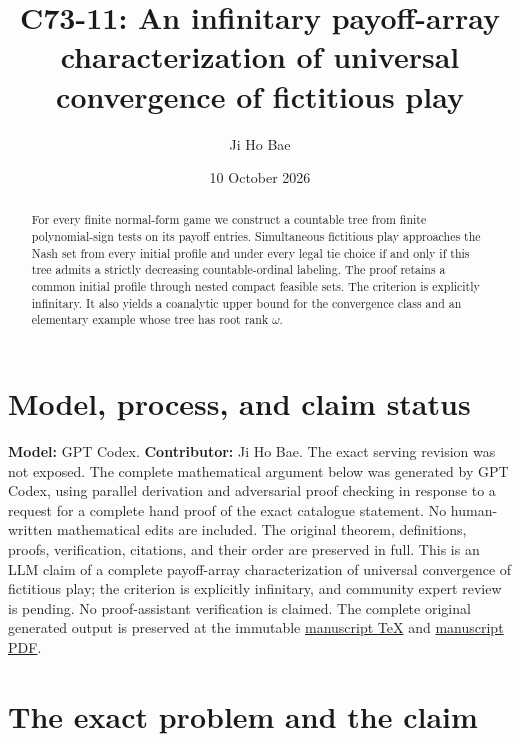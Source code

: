 \documentclass[11pt,a4paper]{article}
\title{C73-11: An infinitary payoff-array characterization\newline
  of universal convergence of fictitious play}
\author{Ji Ho Bae}
\date{10 October 2026}
\theoremstyle{definition}
\begin{document}
\maketitle
\section*{Model, process, and claim status}
\noindent\textbf{Model:} GPT Codex. \textbf{Contributor:} Ji Ho Bae.
The exact serving revision was not exposed.
The complete mathematical argument below was generated by GPT Codex,
using parallel derivation and adversarial proof checking in response to a
request for a complete hand proof of the exact catalogue statement.
No human-written mathematical edits are included. The original theorem,
definitions, proofs, verification, citations, and their order are
preserved in full.
This is an LLM claim of a complete payoff-array characterization of
universal convergence of fictitious play; the criterion is explicitly
infinitary, and community expert review is pending.
No proof-assistant verification is claimed.
The complete original generated output is preserved at the immutable
\href{https://github.com/jbaelaw/universal-fictitious-play-characterization/blob/09c4bb2c4b9b7a64c2a9fb87516da03a1b559abc/paper/Proof.tex}{manuscript TeX}
and \href{https://github.com/jbaelaw/universal-fictitious-play-characterization/blob/09c4bb2c4b9b7a64c2a9fb87516da03a1b559abc/paper/Proof.pdf}{manuscript PDF}.

\begin{abstract}
For every finite normal-form game we construct a countable tree from
finite polynomial-sign tests on its payoff entries. Simultaneous fictitious
play approaches the Nash set from every initial profile and under every
legal tie choice if and only if this tree admits a strictly decreasing
countable-ordinal labeling. The proof retains a common initial profile
through nested compact feasible sets. The criterion is explicitly
infinitary. It also yields a coanalytic upper bound for the convergence
class and an elementary example whose tree has root rank $\omega$.
\end{abstract}

\section{The exact problem and the claim}
\end{document}
